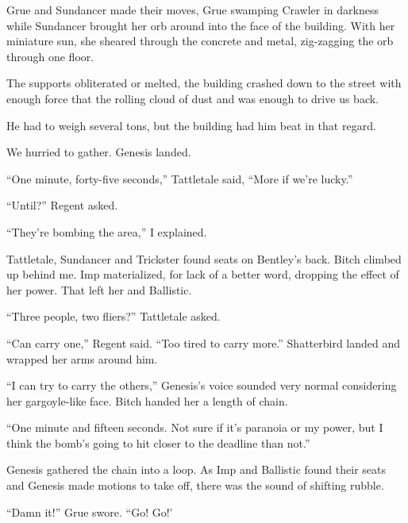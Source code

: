 Grue and Sundancer made their moves, Grue swamping Crawler in darkness while Sundancer brought her orb around into the face of the building.  With her miniature sun, she sheared through the concrete and metal, zig-zagging the orb through one floor.



The supports obliterated or melted, the building crashed down to the street with enough force that the rolling cloud of dust and was enough to drive us back.



He had to weigh several tons, but the building had him beat in that regard.



We hurried to gather.  Genesis landed.



``One minute, forty-five seconds,'' Tattletale said, ``More if we're lucky.''



``Until?''  Regent asked.



``They're bombing the area,'' I explained.



Tattletale, Sundancer and Trickster found seats on Bentley's back.  Bitch climbed up behind me.  Imp materialized, for lack of a better word, dropping the effect of her power.  That left her and Ballistic.



``Three people, two fliers?'' Tattletale asked.



``Can carry one,'' Regent said.  ``Too tired to carry more.''  Shatterbird landed and wrapped her arms around him.



``I can try to carry the others,'' Genesis's voice sounded very normal considering her gargoyle-like face.  Bitch handed her a length of chain.



``One minute and fifteen seconds.  Not sure if it's paranoia or my power, but I think the bomb's going to hit closer to the deadline than not.''



Genesis gathered the chain into a loop.  As Imp and Ballistic found their seats and Genesis made motions to take off, there was the sound of shifting rubble.



``Damn it!''  Grue swore.  ``Go!  Go!'



